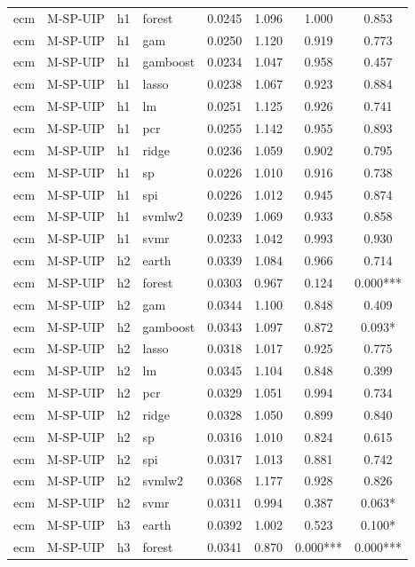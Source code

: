 \begin{ThreePartTable}
\begin{longtable}[t]{llclcccc}
ecm & M-SP-UIP & h1 & forest & 0.0245 & 1.096 & 1.000 & 0.853\\
ecm & M-SP-UIP & h1 & gam & 0.0250 & 1.120 & 0.919 & 0.773\\
ecm & M-SP-UIP & h1 & gamboost & 0.0234 & 1.047 & 0.958 & 0.457\\
ecm & M-SP-UIP & h1 & lasso & 0.0238 & 1.067 & 0.923 & 0.884\\
ecm & M-SP-UIP & h1 & lm & 0.0251 & 1.125 & 0.926 & 0.741\\
ecm & M-SP-UIP & h1 & pcr & 0.0255 & 1.142 & 0.955 & 0.893\\
ecm & M-SP-UIP & h1 & ridge & 0.0236 & 1.059 & 0.902 & 0.795\\
ecm & M-SP-UIP & h1 & sp & 0.0226 & 1.010 & 0.916 & 0.738\\
ecm & M-SP-UIP & h1 & spi & 0.0226 & 1.012 & 0.945 & 0.874\\
ecm & M-SP-UIP & h1 & svmlw2 & 0.0239 & 1.069 & 0.933 & 0.858\\
ecm & M-SP-UIP & h1 & svmr & 0.0233 & 1.042 & 0.993 & 0.930\\
\addlinespace
ecm & M-SP-UIP & h2 & earth & 0.0339 & 1.084 & 0.966 & 0.714\\
ecm & M-SP-UIP & h2 & forest & 0.0303 & 0.967 & 0.124 & 0.000***\\
ecm & M-SP-UIP & h2 & gam & 0.0344 & 1.100 & 0.848 & 0.409\\
ecm & M-SP-UIP & h2 & gamboost & 0.0343 & 1.097 & 0.872 & 0.093*\\
ecm & M-SP-UIP & h2 & lasso & 0.0318 & 1.017 & 0.925 & 0.775\\
ecm & M-SP-UIP & h2 & lm & 0.0345 & 1.104 & 0.848 & 0.399\\
ecm & M-SP-UIP & h2 & pcr & 0.0329 & 1.051 & 0.994 & 0.734\\
ecm & M-SP-UIP & h2 & ridge & 0.0328 & 1.050 & 0.899 & 0.840\\
ecm & M-SP-UIP & h2 & sp & 0.0316 & 1.010 & 0.824 & 0.615\\
ecm & M-SP-UIP & h2 & spi & 0.0317 & 1.013 & 0.881 & 0.742\\
ecm & M-SP-UIP & h2 & svmlw2 & 0.0368 & 1.177 & 0.928 & 0.826\\
ecm & M-SP-UIP & h2 & svmr & 0.0311 & 0.994 & 0.387 & 0.063*\\
\addlinespace
ecm & M-SP-UIP & h3 & earth & 0.0392 & 1.002 & 0.523 & 0.100*\\
ecm & M-SP-UIP & h3 & forest & 0.0341 & 0.870 & 0.000*** & 0.000***\\

\end{longtable}
\end{ThreePartTable}
